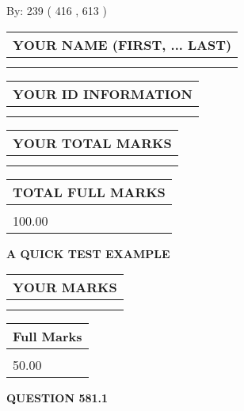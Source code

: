 \documentclass[12pt]{article}
\begin{document}
   
\hspace{1.0in} By: 
 239 ( 416 ,  613 )
   
   
   
   
\newpage 
\setcounter{page}{ 
   581001 } 
   
   
   
   
\noindent\begin{tabular}{|l|}
\hline
YOUR NAME (FIRST, ... LAST)  \\
\hline
 \\ 
 \\ 
\hline
\end{tabular}
\hspace{0.05in} \begin{tabular}{|l|}
\hline
 YOUR   ID   INFORMATION  \\
\hline
 \\ 
 \\ 
\hline
\end{tabular}
   
   
\vspace{0.2in}\noindent\begin{tabular}{|l|}
\hline
YOUR TOTAL MARKS  \\
\hline
 \\ 
 \\ 
\hline
\end{tabular}
\hspace{0.05in} \begin{tabular}{|l|}
\hline
TOTAL FULL MARKS  \\
\hline
 \\ 
100.00 \\
\hline
\end{tabular}
   
   
 \vspace{0.2in}
{\LARGE {\textbf{ A QUICK TEST EXAMPLE}}}
   
   
  
\vspace{0.2in}
  
\noindent\begin{tabular}{|l|}
\hline
 YOUR MARKS  \\
\hline
 \\ 
 \\ 
\hline
\end{tabular}
\hspace{0.05in} \begin{tabular}{|l|}
\hline
 Full Marks  \\
\hline
 \\ 
50.00 \\
\hline
\end{tabular}
{\textbf{\Large{QUESTION
581.1 
}}}
  
\end{document}
